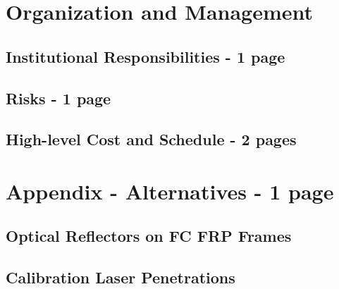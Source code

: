 \section{Organization and Management}
\label{sec:fddp-hv-org}


\subsection{Institutional Responsibilities - 1 page}
\label{sec:fddp-hv-org-consortium}
\subsection{Risks - 1 page}
\label{sec:fddp-hv-org-risk}

\subsection{High-level Cost and Schedule - 2 pages}
\label{sec:fddp-hv-org-cs}



\clearpage


\section{Appendix - Alternatives - 1 page}

\subsection{Optical Reflectors on FC FRP Frames}
\subsection{Calibration Laser Penetrations}
\cleardoublepage